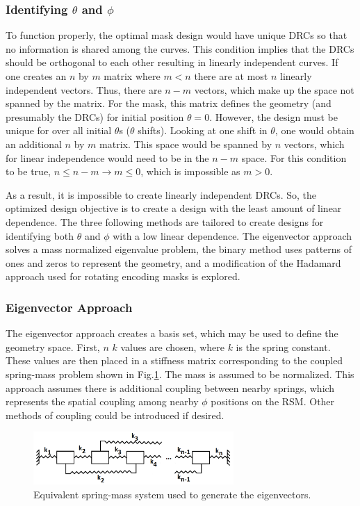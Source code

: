 \documentclass[3p,times]{elsarticle}
\begin{document}
\subsubsection{Identifying $\theta$ and $\phi$}
To function properly, the optimal mask design would have unique DRCs so that no information is shared among the curves.  
This condition implies that the DRCs should be orthogonal to each other resulting in linearly independent curves.  
If one creates an $n$ by $m$ matrix where $m<n$ there are at most $n$ linearly independent vectors.  
Thus, there are $n-m$ vectors, which make up the space not spanned by the matrix.  
For the mask, this matrix defines the geometry (and presumably the DRCs) for initial position $\theta=0$.  
However, the design must be unique for over all initial $\theta$s ($\theta$ shifts).  
Looking at one shift in $\theta$, one would obtain an additional $n$ by $m$ matrix.  
This space would be spanned by $n$ vectors, which for linear independence would
need to be in the $n-m$ space.  
For this condition to be true, $n\leq n-m\rightarrow m\leq 0$, which is impossible as $m>0$.

As a result, it is impossible to create linearly independent DRCs.  
So, the optimized design objective is to create a design with the least amount of linear dependence.  
The three following methods are tailored to create designs for identifying both $\theta$ and $\phi$ with a low linear dependence.  
The eigenvector approach solves a mass normalized eigenvalue problem, the binary method uses patterns of ones and zeros to represent the geometry, and a modification of the Hadamard approach used for rotating encoding masks is explored.

\subsubsection{Eigenvector Approach}
The eigenvector approach creates a basis set, which may be used to define the geometry space.  
First, $n$ $k$ values are chosen, where $k$ is the spring constant.  
These values are then placed in a stiffness matrix corresponding to the coupled spring-mass problem shown in Fig.\ref{fig:stiff}.  
The mass is assumed to be normalized.  
This approach assumes there is additional coupling between nearby springs, which represents the spatial coupling among nearby $\phi$ positions on the RSM.
Other methods of coupling could be introduced if desired.

\begin{figure}[ht!]
\includegraphics[width={3.0in}]{../figs/MassSys.pdf}
\centering
\caption{Equivalent spring-mass system used to generate the eigenvectors.}
\label{fig:stiff}
\end{figure}
\end{document}
